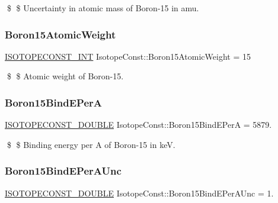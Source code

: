 \$ \$ Uncertainty in atomic mass of Boron-\/15 in amu. \mbox{\label{group___isotope_const-_boron-_b15_gacdba15d684a744862cb8d8a1b69a82eb}} 
\subsubsection{\texorpdfstring{Boron15\+Atomic\+Weight}{Boron15AtomicWeight}}
{\footnotesize\ttfamily \mbox{\hyperlink{group___isotope_const-_macros_ga5f18360b3e99483a35c32d789e62621c}{I\+S\+O\+T\+O\+P\+E\+C\+O\+N\+S\+T\+\_\+\+I\+NT}} Isotope\+Const\+::\+Boron15\+Atomic\+Weight = 15}

\$ \$ Atomic weight of Boron-\/15. \mbox{\label{group___isotope_const-_boron-_b15_ga72e4d2c16c18b386a04531aa057dc0c5}} 
\subsubsection{\texorpdfstring{Boron15\+Bind\+E\+PerA}{Boron15BindEPerA}}
{\footnotesize\ttfamily \mbox{\hyperlink{group___isotope_const-_macros_ga8f45a7272ce02c0b4c65c44636ed719a}{I\+S\+O\+T\+O\+P\+E\+C\+O\+N\+S\+T\+\_\+\+D\+O\+U\+B\+LE}} Isotope\+Const\+::\+Boron15\+Bind\+E\+PerA = 5879.}

\$ \$ Binding energy per A of Boron-\/15 in keV. \mbox{\label{group___isotope_const-_boron-_b15_ga35b2e4be65181a55a536ed197dd30409}} 
\subsubsection{\texorpdfstring{Boron15\+Bind\+E\+Per\+A\+Unc}{Boron15BindEPerAUnc}}
{\footnotesize\ttfamily \mbox{\hyperlink{group___isotope_const-_macros_ga8f45a7272ce02c0b4c65c44636ed719a}{I\+S\+O\+T\+O\+P\+E\+C\+O\+N\+S\+T\+\_\+\+D\+O\+U\+B\+LE}} Isotope\+Const\+::\+Boron15\+Bind\+E\+Per\+A\+Unc = 1.}

